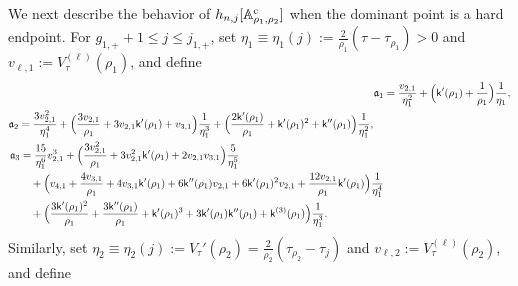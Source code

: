 \documentclass[a4paper]{article}
\numberwithin{equation}{section}
\begin{document}
We next describe the behavior of $h_{n,j}[\mathbb{A}_{\rho_1,\rho_2}^{\rm c}]$ when the dominant point is a hard endpoint. For $g_{1,+}+1\leq j\leq j_{1,+}$, set
$\eta_1\equiv\eta_1(j):=\frac{2}{\rho_1}(\tau-\tau_{\rho_1})>0$ and $v_{\ell,1}:=V_{\tau}^{(\ell)}(\rho_1)$, and define
\begin{align}
\label{def of mathfraka1}
\mathfrak{a}_1
&=
\frac{v_{2,1}}{\eta_1^2}+\Bigl(\mathsf{k}'(\rho_1)+\frac{1}{\rho_1}\Bigr)\frac{1}{\eta_1},
\\
\begin{split}
\label{def of mathfraka2}
\mathfrak{a}_2
&=
\frac{3v_{2,1}^2}{\eta_1^4}+\Bigl(\frac{3v_{2,1}}{\rho_1}+3v_{2,1}\mathsf{k}'(\rho_1)+v_{3,1}\Bigr)\frac{1}{\eta_1^3}
+\Bigl(\frac{2\mathsf{k}'(\rho_1)}{\rho_1}+\mathsf{k}'(\rho_1)^2+\mathsf{k}''(\rho_1)\Bigr)\frac{1}{\eta_1^2},
\end{split}
\\
\begin{split}
\label{def of mathfraka3}
\mathfrak{a}_3
&=
\frac{15}{\eta_1^6}v_{2,1}^3
+\Bigl(\frac{3v_{2,1}^2}{\rho_1}+3v_{2,1}^2\mathsf{k}'(\rho_1)+2v_{2,1}v_{3,1}\Bigr)\frac{5}{\eta_1^5}
\\
&\quad
+\Bigl(v_{4,1}+\frac{4v_{3,1}}{\rho_1}+4v_{3,1}\mathsf{k}'(\rho_1)+6\mathsf{k}''(\rho_1)v_{2,1}+6\mathsf{k}'(\rho_1)^2v_{2,1}+\frac{12v_{2,1}}{\rho_1}\mathsf{k}'(\rho_1)\Bigr)\frac{1}{\eta_1^4}
\\
&\quad
+\Bigl(\frac{3\mathsf{k}'(\rho_1)^2}{\rho_1}+\frac{3\mathsf{k}''(\rho_1)}{\rho_1}+\mathsf{k}'(\rho_1)^3+3\mathsf{k}'(\rho_1)\mathsf{k}''(\rho_1)+\mathsf{k}^{(3)}(\rho_1)\Bigr)
\frac{1}{\eta_1^3}.
\end{split}
\end{align}
Similarly, set $\eta_2\equiv\eta_2(j):=V_{\tau}'(\rho_2)=\frac{2}{\rho_2}(\tau_{\rho_2}-\tau_j)$ and $v_{\ell,2}:=V_{\tau}^{(\ell)}(\rho_2)$, and define
\end{document}

